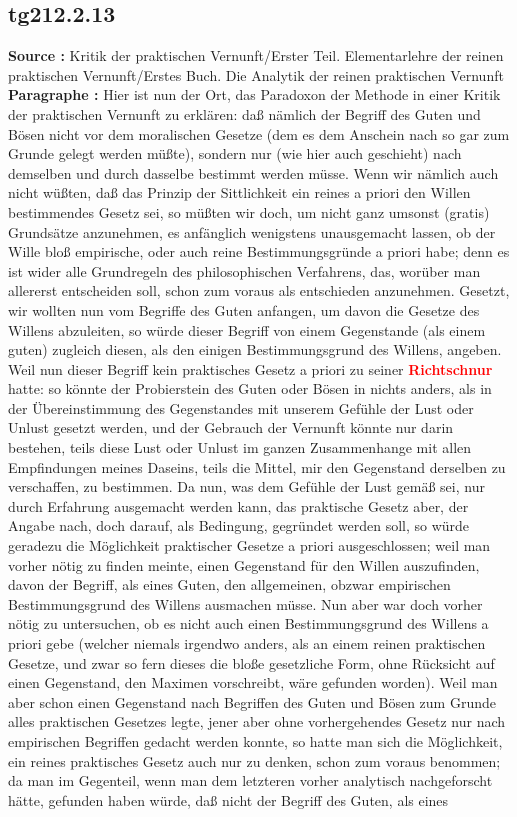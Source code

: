 \documentclass[a4paper,12pt,twoside]{book}
\newcommand{\match}[1]{\textcolor{red}{\textbf{#1}}}
\begin{document}
	\subsection*{tg212.2.13} 
	\textbf{Source : }Kritik der praktischen Vernunft/Erster Teil. Elementarlehre der reinen praktischen Vernunft/Erstes Buch. Die Analytik der reinen praktischen Vernunft\\  
	
	\noindent\textbf{Paragraphe : }Hier ist nun der Ort, das Paradoxon der Methode in einer Kritik der praktischen Vernunft zu erklären: daß nämlich der Begriff des Guten und Bösen nicht vor dem moralischen Gesetze (dem es dem Anschein nach so gar zum Grunde gelegt werden müßte), sondern nur (wie hier auch geschieht) nach demselben und durch dasselbe bestimmt werden müsse. Wenn wir nämlich auch nicht wüßten, daß das Prinzip der Sittlichkeit ein reines a priori den Willen bestimmendes Gesetz sei, so müßten wir doch, um nicht ganz umsonst (gratis)  Grundsätze anzunehmen, es anfänglich wenigstens unausgemacht lassen, ob der Wille bloß empirische, oder auch reine Bestimmungsgründe a priori habe; denn es ist wider alle Grundregeln des philosophischen Verfahrens, das, worüber man allererst entscheiden soll, schon zum voraus als entschieden anzunehmen. Gesetzt, wir wollten nun vom Begriffe des Guten anfangen, um davon die Gesetze des Willens abzuleiten, so würde dieser Begriff von einem Gegenstande (als einem guten) zugleich diesen, als den einigen Bestimmungsgrund des Willens, angeben. Weil nun dieser Begriff kein praktisches Gesetz a priori zu seiner \match{Richtschnur} hatte: so könnte der Probierstein des Guten oder Bösen in nichts anders, als in der Übereinstimmung des Gegenstandes mit unserem Gefühle der Lust oder Unlust gesetzt werden, und der Gebrauch der Vernunft könnte nur darin bestehen, teils diese Lust oder Unlust im ganzen Zusammenhange mit allen Empfindungen meines Daseins, teils die Mittel, mir den Gegenstand derselben zu verschaffen, zu bestimmen. Da nun, was dem Gefühle der Lust gemäß sei, nur durch Erfahrung ausgemacht werden kann, das praktische Gesetz aber, der Angabe nach, doch darauf, als Bedingung, gegründet werden soll, so würde geradezu die Möglichkeit praktischer Gesetze a priori ausgeschlossen; weil man vorher nötig zu finden meinte, einen Gegenstand für den Willen auszufinden, davon der Begriff, als eines Guten, den allgemeinen, obzwar empirischen Bestimmungsgrund des Willens ausmachen müsse. Nun aber war doch vorher nötig zu untersuchen, ob es nicht auch einen Bestimmungsgrund des Willens a priori gebe (welcher niemals irgendwo anders, als an einem reinen praktischen Gesetze, und zwar so fern dieses die bloße gesetzliche Form, ohne Rücksicht auf einen Gegenstand, den Maximen vorschreibt, wäre gefunden worden). Weil man aber schon einen Gegenstand nach Begriffen des Guten und Bösen zum Grunde alles praktischen Gesetzes legte, jener aber ohne vorhergehendes Gesetz nur nach empirischen Begriffen gedacht werden konnte, so hatte man sich die Möglichkeit, ein reines praktisches Gesetz auch nur zu denken, schon zum voraus benommen;  da man im Gegenteil, wenn man dem letzteren vorher analytisch nachgeforscht hätte, gefunden haben würde, daß nicht der Begriff des Guten, als eines 
\end{document}
